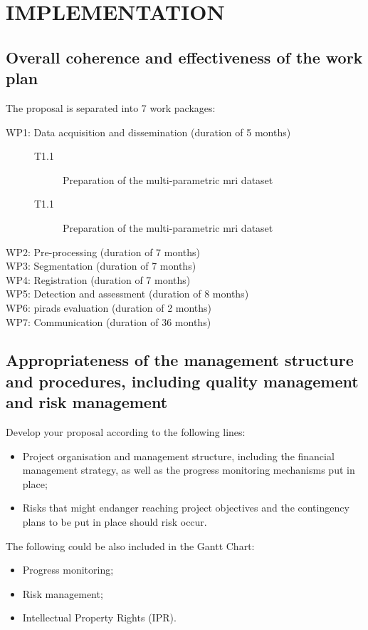 \section{IMPLEMENTATION}
\label{sec:implementation}

\subsection{Overall coherence and effectiveness of the work plan}

The proposal is separated into 7 work packages:

\begin{description}
\item[WP1: Data acquisition and dissemination (duration of 5 months)]


  \begin{description}
  \item[T1.1] Preparation of the multi-parametric \ac{mri} dataset
  \item[T1.1] Preparation of the multi-parametric \ac{mri} dataset
  \end{description}
\item[WP2: Pre-processing (duration of 7 months)]
\item[WP3: Segmentation (duration of 7 months)]
\item[WP4: Registration (duration of 7 months)]
\item[WP5: Detection and assessment (duration of 8 months)]
\item[WP6: \ac{pirads} evaluation (duration of 2 months)]
\item[WP7: Communication (duration of 36 months)]
\end{description}

\subsection{Appropriateness of the management structure and procedures, including quality management and risk management}

Develop your proposal according to the following lines:
\begin{itemize}
\item Project organisation and management structure, including the financial management strategy, as well as the progress monitoring mechanisms put in place;
\item Risks that might endanger reaching project objectives and the contingency plans to be put in place should risk occur.
\end{itemize}
The following could be also included in the Gantt Chart:
\begin{itemize}
\item Progress monitoring;
\item Risk management;
\item Intellectual Property Rights (IPR).
\end{itemize}

